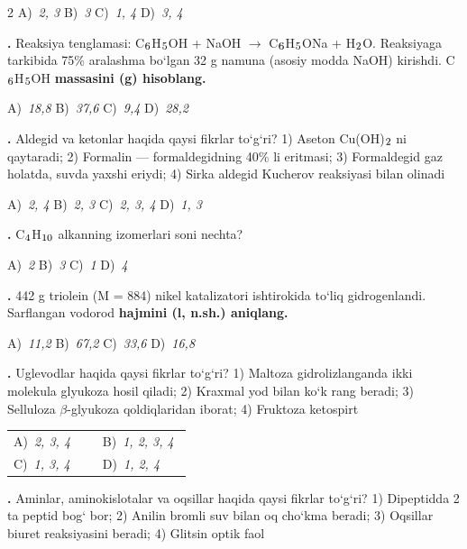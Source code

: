 \documentclass[11pt,a4paper]{article}
\renewcommand{\textsubscript}[1]{\ensuremath{_{\text{\fontsize{8}{8}\selectfont #1}}}}
\newcommand{\qn}[1]{\textbf{\fontsize{11.5}{13}\selectfont #1}}
\newcommand{\qsep}{\par\vspace{1pt}\noindent\rule{0pt}{0.4pt}\par\vspace{5pt}}
\begin{document}
\begin{multicols}{2}
\noindent A)~\textsl{2, 3} \hfill B)~\textsl{3} \hfill C)~\textsl{1, 4} \hfill D)~\textsl{3, 4}\par
\qsep
\noindent\qn{23.} Reaksiya tenglamasi: C\textsubscript{6}H\textsubscript{5}OH + NaOH $\to$ C\textsubscript{6}H\textsubscript{5}ONa + H\textsubscript{2}O. Reaksiyaga tarkibida 75\% aralashma bo`lgan 32 g namuna (asosiy modda NaOH) kirishdi. C\textsubscript{6}H\textsubscript{5}OH \textbf{massasini (g) hisoblang.}

\noindent A)~\textsl{18,8} \hfill B)~\textsl{37,6} \hfill C)~\textsl{9,4} \hfill D)~\textsl{28,2}\par
\qsep
\noindent\qn{24.} Aldegid va ketonlar haqida qaysi fikrlar to`g`ri? 1) Aseton Cu(OH)\textsubscript{2} ni qaytaradi; 2) Formalin --- formaldegidning 40\% li eritmasi; 3) Formaldegid gaz holatda, suvda yaxshi eriydi; 4) Sirka aldegid Kucherov reaksiyasi bilan olinadi

\noindent A)~\textsl{2, 4} \hfill B)~\textsl{2, 3} \hfill C)~\textsl{2, 3, 4} \hfill D)~\textsl{1, 3}\par
\qsep
\noindent\qn{25.} C\textsubscript{4}H\textsubscript{10} alkanning izomerlari soni nechta?

\noindent A)~\textsl{2} \hfill B)~\textsl{3} \hfill C)~\textsl{1} \hfill D)~\textsl{4}\par
\qsep
\noindent\qn{26.} 442 g triolein (M = 884) nikel katalizatori ishtirokida to`liq gidrogenlandi. Sarflangan vodorod \textbf{hajmini (l, n.sh.) aniqlang.}

\noindent A)~\textsl{11,2} \hfill B)~\textsl{67,2} \hfill C)~\textsl{33,6} \hfill D)~\textsl{16,8}\par
\qsep
\noindent\qn{27.} Uglevodlar haqida qaysi fikrlar to`g`ri? 1) Maltoza gidrolizlanganda ikki molekula glyukoza hosil qiladi; 2) Kraxmal yod bilan ko`k rang beradi; 3) Selluloza $\beta$-glyukoza qoldiqlaridan iborat; 4) Fruktoza ketospirt

\noindent\begin{tabular}{@{}p{0.47\linewidth}@{}p{0.47\linewidth}@{}}
A)~\textsl{2, 3, 4} & B)~\textsl{1, 2, 3, 4} \\
C)~\textsl{1, 3, 4} & D)~\textsl{1, 2, 4} \\
\end{tabular}\par
\qsep
\noindent\qn{28.} Aminlar, aminokislotalar va oqsillar haqida qaysi fikrlar to`g`ri? 1) Dipeptidda 2 ta peptid bog` bor; 2) Anilin bromli suv bilan oq cho`kma beradi; 3) Oqsillar biuret reaksiyasini beradi; 4) Glitsin optik faol


\end{multicols}
\end{document}

